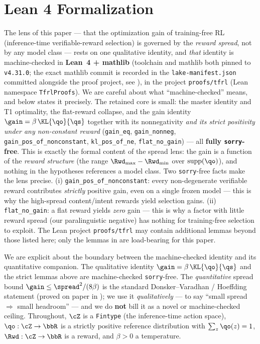 \appendix

\section{Lean 4 Formalization}
\label{app:lean}

The lens of this paper --- that the optimization gain of training-free RL (inference-time
verifiable-reward selection) is governed by the \emph{reward spread}, not by any model class --- rests
on one qualitative identity, and \emph{that} identity is machine-checked in \textbf{Lean~4 + mathlib}
(toolchain and mathlib both pinned to \texttt{v4.31.0}; the exact mathlib commit is recorded in the
\texttt{lake-manifest.json} committed alongside the proof project, see ), in the
project \texttt{proofs/tfrl} (Lean namespace \texttt{TfrlProofs}). We are careful about what
``machine-checked'' means, and  below states it precisely. The retained core is
small: the master identity and T1 optimality, the flat-reward collapse, and the gain identity
$\gain=\beta\,\KL{\qo}{\qs}$ together with its nonnegativity \emph{and its strict positivity under any
non-constant reward} (\texttt{gain\_eq}, \texttt{gain\_nonneg}, \texttt{gain\_pos\_of\_nonconstant},
\texttt{kl\_pos\_of\_ne}, \texttt{flat\_no\_gain}) --- all \textbf{fully \texttt{sorry}-free}. This is
exactly the formal content of the spread lens: the gain is a function of the \emph{reward structure}
(the range $\Rwd_{\max}-\Rwd_{\min}$ over $\operatorname{supp}(\qo)$), and nothing in the hypotheses
references a model class. Two \texttt{sorry}-free facts make the lens precise. (i)
\texttt{gain\_pos\_of\_nonconstant}: every non-degenerate verifiable reward contributes \emph{strictly}
positive gain, even on a single frozen model --- this is why the high-spread content/intent rewards
yield selection gains. (ii) \texttt{flat\_no\_gain}: a flat reward yields \emph{zero} gain --- this is
why a factor with little reward spread (our paralinguistic negative) has nothing for training-free
selection to exploit. The Lean project \texttt{proofs/tfrl} may contain additional lemmas beyond those
listed here; only the lemmas in  are load-bearing for this paper.

We are explicit about the boundary between the machine-checked identity and its quantitative
companion. The qualitative identity $\gain=\beta\,\KL{\qo}{\qs}$ and the strict lemmas above are
machine-checked \texttt{sorry}-free. The \emph{quantitative} spread bound $\gain\le\spread^2/(8\beta)$
is the standard Donsker--Varadhan / Hoeffding statement (proved on paper in );
we use it \emph{qualitatively} --- to say ``small spread $\Rightarrow$ small headroom'' --- and we do
\textbf{not} bill it as a novel or machine-checked ceiling. Throughout, $\cZ$ is a \texttt{Fintype}
(the inference-time action space), $\qo:\cZ\to\bbR$ is a strictly positive reference distribution with
$\sum_z \qo(z)=1$, $\Rwd:\cZ\to\bbR$ is a reward, and $\beta>0$ a temperature.

